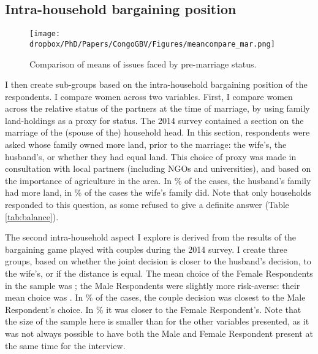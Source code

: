 \subsection{Intra-household bargaining position}
\begin{figure}[htb]
  \texttt{[image: \\dropbox/PhD/Papers/CongoGBV/Figures/meancompare\_mar.png]}
  \caption{Comparison of means of issues faced by pre-marriage status.}
  \label{fig:meancompare_mar}
\end{figure}

I then create sub-groups based on the intra-household bargaining position of the respondents. I compare women across two variables. First, I compare women across the relative status of the partners at the time of marriage, by using family land-holdings as a proxy for status. The 2014 survey contained a section on the marriage of the (spouse of the) household head. In this section, respondents were asked whose family owned more land, prior to the marriage: the wife's, the husband's, or whether they had equal land. This choice of proxy was made in consultation with local partners (including NGOs and universities), and based on the importance of agriculture in the area. In \% of the cases, the husband's family had more land, in \% of the cases the wife's family did. Note that only  households responded to this question, as some refused to give a definite answer (Table \ref{tab:balance}). 

The second intra-household aspect I explore is derived from the results of the bargaining game played with couples during the 2014 survey. I create three groups, based on whether the joint decision is closer to the husband's decision, to the wife's, or if the distance is equal. The mean choice of the Female Respondents in the sample was ; the Male Respondents were slightly more risk-averse: their mean choice was . In \% of the cases, the couple decision was closest to the Male Respondent's choice. In \% it was closer to the Female Respondent's. Note that the size of the sample here is smaller than for the other variables presented, as it was not always possible to have both the Male and Female Respondent present at the same time for the interview.

